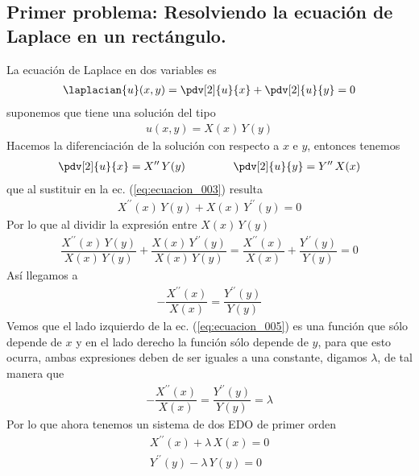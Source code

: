\subsection{Primer problema: Resolviendo la ecuación de Laplace en un rectángulo.}
La ecuación de Laplace en dos variables es
\begin{align}
\laplacian{u} (x, y) = \pdv[2]{u}{x} + \pdv[2]{u}{y} = 0
\label{eq:ecuacion_003}    
\end{align}
suponemos que tiene una solución del tipo
\begin{align}
u(x, y) = X(x) \, Y(y)
\label{eq:ecuacion_004}
\end{align}
Hacemos la diferenciación de la solución con respecto a $x$ e $y$, entonces tenemos
\begin{align*}
\pdv[2]{u}{x} = X^{\prime \prime} \, Y(y) \hspace{1.5cm} \pdv[2]{u}{y} = Y^{\prime \prime} \, X(x)
\end{align*}
que al sustituir en la ec. (\ref{eq:ecuacion_003}) resulta
\begin{align*}
X^{\prime \prime}(x) \, Y(y) + X(x) \, Y^{\prime \prime}(y) = 0
\end{align*}
Por lo que al dividir la expresión entre $X(x) \, Y(y)$
\begin{align*}
\dfrac{X^{\prime \prime}(x) \, Y(y)}{X(x) \, Y(y)} + \dfrac{X(x) \, Y^{\prime \prime}(y)}{X(x) \, Y(y)} = \dfrac{X^{\prime \prime}(x)}{X(x)} + \dfrac{Y^{\prime \prime}(y)}{Y(y)} = 0
\end{align*}
Así llegamos a
\begin{align}
- \dfrac{X^{\prime \prime}(x)}{X(x)} = \dfrac{Y^{\prime \prime}(y)}{Y(y)}
\label{eq:ecuacion_005}    
\end{align}
Vemos que el lado izquierdo de la ec. (\ref{eq:ecuacion_005}) es una función que sólo depende de $x$ y en el lado derecho la función sólo depende de $y$, para que esto ocurra, ambas expresiones deben de ser iguales a una constante, digamos $\lambda$, de tal manera que
\begin{align*}
- \dfrac{X^{\prime \prime}(x)}{X(x)} = \dfrac{Y^{\prime \prime}(y)}{Y(y)}
 = \lambda
\end{align*}
Por lo que ahora tenemos un sistema de dos EDO de primer orden
\begin{subequations}
\begin{align}
X^{\prime \prime} (x) + \lambda \, X(x) = 0 \label{eq:ecuacion_006a} \\
Y^{\prime \prime} (y) - \lambda \, Y(y) = 0 \label{eq:ecuacion_006b}
\end{align}
\end{subequations}
